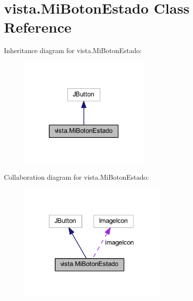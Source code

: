 \hypertarget{classvista_1_1_mi_boton_estado}{}\section{vista.\+Mi\+Boton\+Estado Class Reference}
\label{classvista_1_1_mi_boton_estado}


Inheritance diagram for vista.\+Mi\+Boton\+Estado\+:
\nopagebreak
\begin{figure}[H]
\begin{center}
\leavevmode
\includegraphics[width=186pt]{classvista_1_1_mi_boton_estado__inherit__graph}
\end{center}
\end{figure}


Collaboration diagram for vista.\+Mi\+Boton\+Estado\+:
\nopagebreak
\begin{figure}[H]
\begin{center}
\leavevmode
\includegraphics[width=211pt]{classvista_1_1_mi_boton_estado__coll__graph}
\end{center}
\end{figure}
